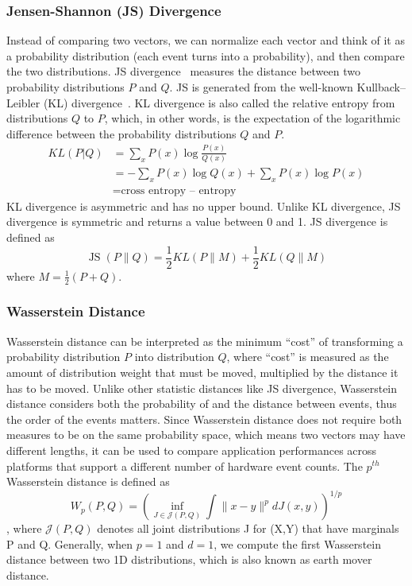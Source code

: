 \documentclass[conference]{IEEEtran}
\begin{document}
\subsubsection{Jensen-Shannon (JS) Divergence}
\label{sec:JS}
Instead of comparing two vectors, we can normalize each vector and think of it as a probability distribution (each event turns into a probability), and then compare the two distributions.
JS divergence~\cite{endres2003new} measures the distance between two probability distributions $P$ and $Q$. JS is generated from the well-known Kullback–Leibler (KL) divergence~\cite{kullback1951information}. KL divergence is also called the relative entropy from distributions $Q$ to $P$, which, in other words, is the expectation of the logarithmic difference between the probability distributions $Q$ and $P$. 
\begin{align*}
KL(P|Q)&=\sum_{x} P(x) \log \frac{P(x)}{Q(x)} \\ 
&=-\sum_{x} P(x) \log {Q(x)}+\sum_{x} P(x) \log {P(x)} \\ 
& =\textrm{cross entropy – entropy}
\end{align*}
KL divergence is asymmetric and has no upper bound. Unlike KL divergence, JS divergence is symmetric and returns a value between 0 and 1. %
JS divergence is defined as 
\begin{equation}
\operatorname{JS}(P \| Q)=\frac{1}{2} KL(P \| M)+\frac{1}{2} KL(Q \| M)
\end{equation}
where $M=\frac{1}{2}(P+Q)$.%

\subsubsection{Wasserstein Distance}
\label{sec:wass}
Wasserstein distance\cite{rubner2000earth} can be interpreted as the minimum ``cost'' of transforming a probability distribution $P$ into distribution $Q$, where ``cost'' is measured as the amount of distribution weight that must be moved, multiplied by the distance it has to be moved. Unlike other statistic distances like JS divergence, Wasserstein distance considers both the probability of and the distance between events, thus the order of the events matters. Since Wasserstein distance does not require both measures to be on the same probability space, which means two vectors may have different lengths, it can be used to compare application performances across platforms that support a different number of hardware event counts. The $p^{th}$ Wasserstein distance is defined as 
\begin{equation}
W_{p}(P, Q)=\left(\inf _{J \in \mathcal{J}(P, Q)} \int\|x-y\|^{p} d J(x, y)\right)^{1 / p}
\end{equation},
where $\mathcal{J}(P, Q)$ denotes all joint distributions J for (X,Y) that have marginals P and Q. Generally, when $p = 1$ and $d = 1$, we compute the first Wasserstein distance between two 1D distributions, which is also known as earth mover distance. 
\end{document}
